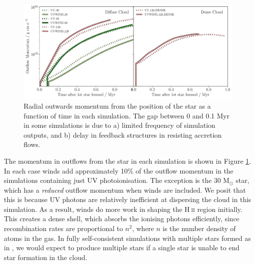 \documentclass[a4paper,fleqn,usenatbib]{mnras}
\newcommand{\Msolar}{M$_{\odot}$\xspace}
\newcommand{\HII}{H$~$\textsc{ii}\xspace}
\begin{document}

\begin{figure}
	\includegraphics[width=2\columnwidth]{plots/fig2a.pdf}
	\caption{Radial outwards momentum from the position of the star as a function of time in each simulation. The gap between 0 and 0.1 Myr in some simulations is due to a) limited frequency of simulation outputs, and b) delay in feedback structures in resisting accretion flows.}
	\label{fig:momentum}
\end{figure}

The momentum in outflows from the star in each simulation is shown in Figure \ref{fig:momentum}. In each case winds add approximately 10\% of the outflow momentum in the simulations containing just UV photoionisation. The exception is the 30 \Msolar star, which has a \textit{reduced} outflow momentum when winds are included. We posit that this is because UV photons are relatively inefficient at dispersing the cloud in this simulation. As a result, winds do more work in shaping the \HII region initially. This creates a dense shell, which absorbs the ionising photons efficiently, since recombination rates are proportional to $n^2$, where $n$ is the number density of atoms in the gas. In fully self-consistent simulations with multiple stars formed as in \cite{Geen2018}, we would expect to produce multiple stars if a single star is unable to end star formation in the cloud.
\end{document}
